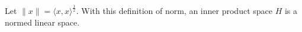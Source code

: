 Let $\|x\| = \langle x, x \rangle^{\frac{1}{2}}$. With this definition of norm, an inner product space $H$ is a normed linear space.